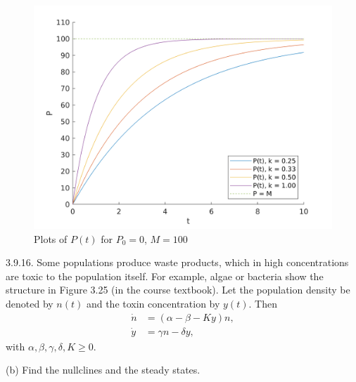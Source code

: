 \documentclass{article}
\begin{document}
\begin{figure}
    \includegraphics[width=5in]{q392b}
    \centering
    \caption{Plots of $P(t)$ for $P_0 = 0$, $M = 100$}
    \label{fig:q392b}
\end{figure}

\newpage

3.9.16. Some populations produce waste products, which in high concentrations are
toxic to the population itself. For example, algae or bacteria show the structure
in Figure 3.25 (in the course textbook). Let the population density be denoted
by $n(t)$ and the toxin concentration by $y(t)$. Then
%
\begin{align*}
    \dot{n} &= (\alpha - \beta - K y) n, \\
    \dot{y} &= \gamma n - \delta y,
\end{align*}
%
with $\alpha, \beta, \gamma, \delta, K \geq 0$.

(b) Find the nullclines and the steady states.
\end{document}
